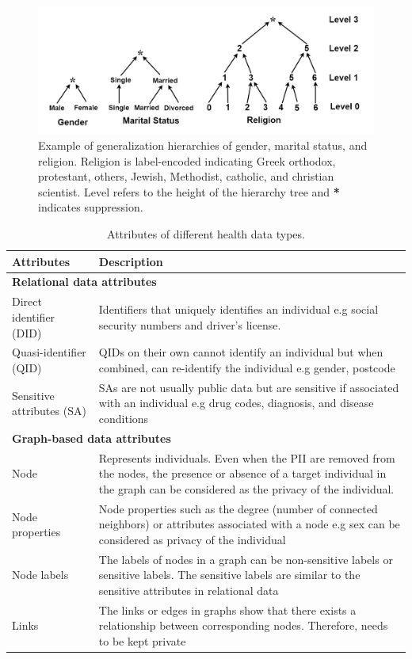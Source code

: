 \documentclass{bioinfo}
\begin{document}
\begin{figure}[!tpb]%
\centerline{\includegraphics[width=\linewidth]{GeneralizationHierarchy.png}}
\caption{Example of generalization hierarchies of gender, marital status, and religion. Religion is label-encoded indicating Greek orthodox, protestant, others, Jewish, Methodist, catholic, and christian scientist. Level refers to the height of the hierarchy tree and \textbf{*} indicates suppression.}\label{generalizationhierarchy}
\end{figure}





\begin{table}[!h]
\caption{Attributes of different health data types.}
\label{structureattrgraphattr}
\begin{tabular}{p{2.5cm}p{5cm}}
Attributes & Description \\ \toprule
\multicolumn{2}{l}{\textbf{Relational data attributes}} \\ \midrule
Direct identifier (DID) & Identifiers that uniquely identifies an individual e.g social security numbers and driver's license. \\
Quasi-identifier (QID) & QIDs on their own cannot identify an individual but when combined, can re-identify the individual e.g gender, postcode \\
Sensitive attributes (SA) & SAs are not usually public data but are sensitive if associated with an individual e.g drug codes, diagnosis, and disease conditions \\ \midrule
\multicolumn{2}{l}{\textbf{Graph-based data attributes}} \\ \midrule
Node & Represents individuals. Even when the PII are removed from the nodes, the presence or absence of a target individual in the graph can be considered as the privacy of the individual. \\
Node properties & Node properties such as the degree (number of connected neighbors) or attributes associated with a node e.g sex can be considered as privacy of the individual \\
Node labels & The labels of nodes in a graph can be non-sensitive labels or sensitive labels. The sensitive labels are similar to the sensitive attributes in relational data \\
Links & The links or edges in graphs show that there exists a relationship between corresponding nodes. Therefore, needs to be kept private
\end{tabular}
\end{table}
\end{document}
